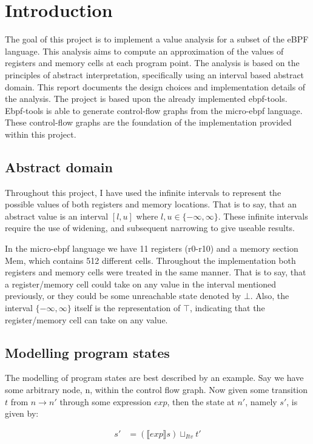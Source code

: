 \section{Introduction}\label{sec:introduction}
The goal of this project is to implement a value analysis for a subset of the
eBPF language. This analysis aims to compute an approximation of the values of
registers and memory cells at each program point. The analysis is based on the
principles of abstract interpretation, specifically using an interval based
abstract domain. This report documents the design choices and implementation
details of the analysis. The project is based upon the already implemented
ebpf-tools\cite{ebpf}. Ebpf-tools is able to generate control-flow graphs
from the micro-ebpf language. These control-flow graphs are the foundation of
the implementation provided within this project.

\subsection{Abstract domain}
Throughout this project, I have used the infinite intervals to represent the
possible values of both registers and memory locations. That is to say, that an
abstract value is an interval $[l, u]$ where $l, u \in \{-\infty, \infty\}$.
These infinite intervals require the use of widening, and subsequent narrowing
to give useable results.

In the micro-ebpf language we have 11 registers (r0-r10) and a memory section
Mem, which contains 512 different cells. Throughout the implementation both
registers and memory cells were treated in the same manner. That is to say,
that a register/memory cell could take on any value in the interval mentioned
previously, or they could be some unreachable state denoted by $\bot$. Also,
the interval $\{-\infty, \infty\}$ itself is the representation of $\top$,
indicating that the register/memory cell can take on any value.

\subsection{Modelling program states}
The modelling of program states are best described by an example. Say we have
some arbitrary node, n, within the control flow graph. Now given some
transition $t$ from $n \to n'$ through some expression $exp$, then the state at
$n'$, namely $s'$, is given by:

\begin{align}
  s' &= (\llbracket exp \rrbracket s) \sqcup_{Itv} t' \label{eq:1}
\end{align}

